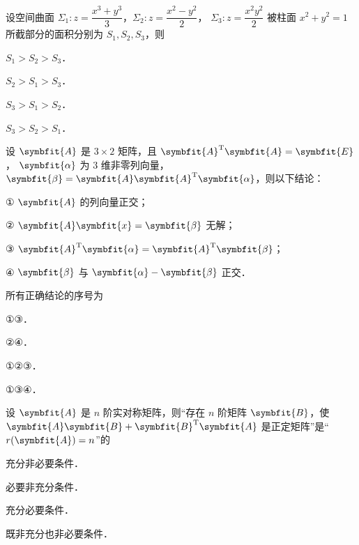 \begin{question}[index=4]
设空间曲面 $\Sigma_1:z=\dfrac{x^3+y^3}{3}$，$\Sigma_2:z=\dfrac{x^2-y^2}{2}$，
$\Sigma_3:z=\dfrac{x^2y^2}{2}$ 被柱面 $x^2+y^2=1$ 所截部分的面积分别为 $S_1,S_2,S_3$，则
\begin{choices}[columns=2]
\item $S_1>S_2>S_3$．
\item $S_2>S_1>S_3$．
\item $S_3>S_1>S_2$．
\item $S_3>S_2>S_1$．
\end{choices}
\end{question}
\QuestionBreak

\begin{question}[index=5]
设 $\symbfit{A}$ 是 $3\times2$ 矩阵，且 $\symbfit{A}^{\mathrm T}\symbfit{A}=\symbfit{E}$，
$\symbfit{\alpha}$ 为 $3$ 维非零列向量，$\symbfit{\beta}=\symbfit{A}\symbfit{A}^{\mathrm T}\symbfit{\alpha}$，则以下结论：
\par ① $\symbfit{A}$ 的列向量正交；
\par ② $\symbfit{A}\symbfit{x}=\symbfit{\beta}$ 无解；
\par ③ $\symbfit{A}^{\mathrm T}\symbfit{\alpha}=\symbfit{A}^{\mathrm T}\symbfit{\beta}$；
\par ④ $\symbfit{\beta}$ 与 $\symbfit{\alpha}-\symbfit{\beta}$ 正交．
\par 所有正确结论的序号为
\begin{choices}[columns=2]
\item ①③．
\item ②④．
\item ①②③．
\item ①③④．
\end{choices}
\end{question}
\QuestionBreak

\begin{question}[index=6]
设 $\symbfit{A}$ 是 $n$ 阶实对称矩阵，则“存在 $n$ 阶矩阵 $\symbfit{B}$，使
$\symbfit{A}\symbfit{B}+\symbfit{B}^{\mathrm T}\symbfit{A}$ 是正定矩阵”是“$r(\symbfit{A})=n$”的
\begin{choices}[columns=2]
\item 充分非必要条件．
\item 必要非充分条件．
\item 充分必要条件．
\item 既非充分也非必要条件．
\end{choices}
\end{question}
\QuestionBreak

